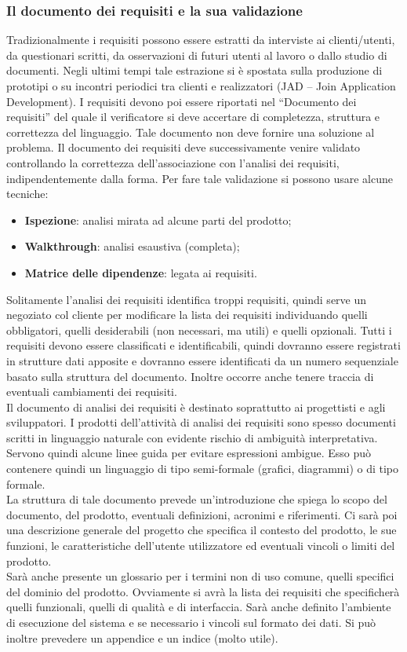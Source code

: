 \subsubsection{Il documento dei requisiti e la sua validazione}
Tradizionalmente i requisiti possono essere estratti da interviste ai clienti/utenti, da questionari scritti, da osservazioni di futuri utenti al lavoro o dallo studio di documenti.
Negli ultimi tempi tale estrazione si è spostata sulla produzione di prototipi o su incontri periodici tra clienti e realizzatori (JAD – Join Application Development).
I requisiti devono poi essere riportati nel ``Documento dei requisiti'' del quale il verificatore si deve accertare di completezza, struttura e correttezza del linguaggio. 
Tale documento non deve fornire una soluzione al problema.
Il documento dei requisiti deve successivamente venire validato controllando la correttezza dell'associazione con l'analisi dei requisiti, indipendentemente dalla forma. Per fare tale validazione si possono usare alcune tecniche:
\begin{itemize}
\item \textbf{Ispezione}: analisi mirata ad alcune parti del prodotto;
\item \textbf{Walkthrough}: analisi esaustiva (completa);
\item \textbf{Matrice delle dipendenze}: legata ai requisiti.
\end{itemize}
Solitamente l'analisi dei requisiti identifica troppi requisiti, quindi serve un negoziato col cliente per modificare la lista dei requisiti individuando quelli obbligatori, quelli desiderabili (non necessari, ma utili) e quelli opzionali.
Tutti i requisiti devono essere classificati e identificabili, quindi dovranno essere registrati in strutture dati apposite e dovranno essere identificati da un numero sequenziale basato sulla struttura del documento. Inoltre occorre anche tenere traccia di eventuali cambiamenti dei requisiti.\\
Il documento di analisi dei requisiti è destinato soprattutto ai progettisti e agli sviluppatori. I prodotti dell'attività di analisi dei requisiti sono spesso documenti scritti in linguaggio naturale con evidente rischio di ambiguità interpretativa. 
Servono quindi alcune linee guida per evitare espressioni ambigue. Esso può contenere quindi un linguaggio di tipo semi-formale (grafici, diagrammi) o di tipo formale.\\
La struttura di tale documento prevede un'introduzione che spiega lo scopo del documento, del prodotto, eventuali definizioni, acronimi e riferimenti. Ci sarà poi una descrizione generale del progetto che specifica il contesto del prodotto, le sue funzioni, le caratteristiche dell'utente utilizzatore ed eventuali vincoli o limiti del prodotto.\\
Sarà anche presente un glossario per i termini non di uso comune, quelli specifici del dominio del prodotto. 
Ovviamente si avrà la lista dei requisiti che specificherà quelli funzionali, quelli di qualità e di interfaccia. 
Sarà anche definito l'ambiente di esecuzione del sistema e se necessario i vincoli sul formato dei dati.
Si può inoltre prevedere un appendice e un indice (molto utile).

